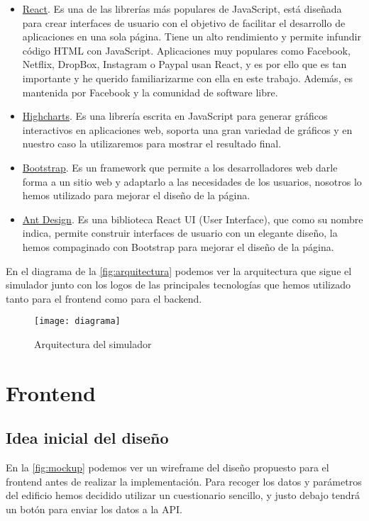 \begin{itemize}
	\item \href{https://es.react.dev}{React}. Es una de las librerías más populares de JavaScript, está diseñada para crear interfaces de usuario con el objetivo de facilitar el desarrollo de aplicaciones en una sola página. Tiene un alto rendimiento y permite infundir código HTML con JavaScript. Aplicaciones muy populares como Facebook, Netflix, DropBox, Instagram o Paypal usan React, y es por ello que es tan importante y he querido familiarizarme con ella en este trabajo. Además, es mantenida por Facebook y la comunidad de software libre.
	\item \href{https://www.highcharts.com}{Highcharts}. Es una librería escrita en JavaScript para generar gráficos interactivos en aplicaciones web, soporta una gran variedad de gráficos y en nuestro caso la utilizaremos para mostrar el resultado final.
	\item \href{https://getbootstrap.com}{Bootstrap}. Es un framework que permite a los desarrolladores web darle forma a un sitio web y adaptarlo a las necesidades de los usuarios, nosotros lo hemos utilizado para mejorar el diseño de la página.
	\item \href{https://ant.design}{Ant Design}. Es una biblioteca React UI (User Interface), que como su nombre indica, permite construir interfaces de usuario con un elegante diseño, la hemos compaginado con Bootstrap para mejorar el diseño de la página.
\end{itemize}
En el diagrama de la \autoref{fig:arquitectura} podemos ver la arquitectura que sigue el simulador junto con los logos de las principales tecnologías que hemos utilizado tanto para el frontend como para el backend.
\begin{figure}[h!]
	\centering
	\texttt{[image: diagrama]}
	\caption{Arquitectura del simulador}
	\label{fig:arquitectura}
\end{figure}
\section{Frontend}
\subsection{Idea inicial del diseño}
En la \autoref{fig:mockup} podemos ver un wireframe del diseño propuesto para el frontend antes de realizar la implementación. Para recoger los datos y parámetros del edificio hemos decidido utilizar un cuestionario sencillo, y justo debajo tendrá un botón para enviar los datos a la API.

